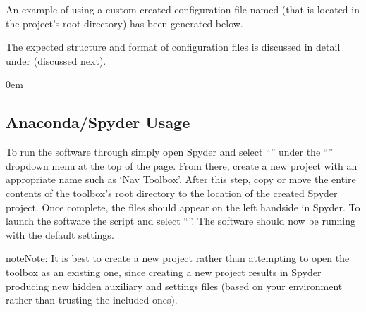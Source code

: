 \documentclass[letterpaper,10pt,english]{sphinxmanual}
\let\sphinxpxdimen\pdfpxdimen\else\newdimen\sphinxpxdimen
\begin{document}
\sphinxAtStartPar
An example of using a custom created configuration file named  (that is located in the project’s
root directory) has been generated below.
\def\sphinxLiteralBlockLabel{\label{\detokenize{usage/execution:id4}}}
\begin{sphinxVerbatim}[commandchars=\\\{\}]
  
\end{sphinxVerbatim}

\sphinxAtStartPar
The expected structure and format of configuration files is discussed in detail under
{\hyperref[\detokenize{usage/configuration:user-configuration}]{}} (discussed next).

\begin{DUlineblock}{0em}
\item[] 
\end{DUlineblock}


\subsection{Anaconda/Spyder Usage}
\label{\detokenize{usage/execution:anaconda-spyder-usage}}
\noindent{\hspace*{\fill}\sphinxincludegraphics[height=100\sphinxpxdimen]{{spyder_icon}.png}\hspace*{\fill}}

\sphinxAtStartPar
To run the software through  simply open Spyder and
select “” under the “” dropdown menu at the top of the page. From there, create a new
project with an appropriate name such as ‘Nav Toolbox’. After this step, copy or move the entire contents of the
toolbox’s root directory to the location of the created Spyder project. Once complete, the files should appear on
the left hand\sphinxhyphen{}side in Spyder. To launch the software  the script  and select “”.
The software should now be running with the default settings.

\begin{sphinxadmonition}{note}{Note:}
\sphinxAtStartPar
It is best to create a new project rather than attempting to open the toolbox as an existing one, since
creating a new project results in Spyder producing new hidden auxiliary and settings files (based on your
environment rather than trusting the included ones).
\end{sphinxadmonition}
\end{document}
